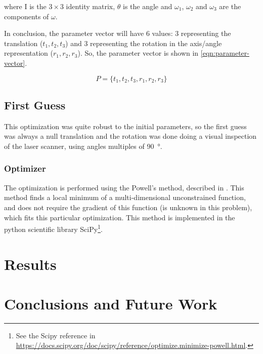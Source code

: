 \documentclass[conference]{IEEEtran}
\begin{document}
\noindent
where I is the $3\times3$ identity matrix, $\theta$ is the angle and $\omega_1$, $\omega_2$ and $\omega_3$ are the components of $\omega$.

In conclusion, the parameter vector will have 6 values: 3 representing the translation ($t_1, t_2, t_3$) and 3 representing the rotation in the axis/angle representation ($r_1, r_2, r_3$). So, the parameter vector is shown in \cref{eqn:parameter-vector}.

\begin{equation}
    \label{eqn:parameter-vector}
    P = \{t_1, t_2, t_3, r_1, r_2, r_3\}
\end{equation}

\subsection{First Guess}

This optimization was quite robust to the initial parameters, so the first guess was always a null translation and the rotation was done doing a visual inspection of the laser scanner, using angles multiples of \SI{90}{\degree}.

\subsubsection{Optimizer}

The optimization is performed using the Powell's method, described in \cite{powell64}. This method finds a local minimum of a multi-dimensional unconstrained function, and does not require the gradient of this function (is unknown in this problem), which fits this particular optimization. This method is implemented in the python scientific library SciPy\footnote{See the Scipy reference in \url{https://docs.scipy.org/doc/scipy/reference/optimize.minimize-powell.html}.}.


\section{Results}\label{sec:results}

\section{Conclusions and Future Work}\label{sec:conclusions}
\end{document}

